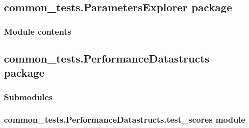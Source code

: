 \documentclass[letterpaper,10pt,english]{sphinxmanual}
\begin{document}
\subsection{common\_tests.ParametersExplorer package}
\label{\detokenize{common_tests.ParametersExplorer:common-tests-parametersexplorer-package}}\label{\detokenize{common_tests.ParametersExplorer::doc}}

\subsubsection{Module contents}
\label{\detokenize{common_tests.ParametersExplorer:module-common_tests.ParametersExplorer}}\label{\detokenize{common_tests.ParametersExplorer:module-contents}}

\subsection{common\_tests.PerformanceDatastructs package}
\label{\detokenize{common_tests.PerformanceDatastructs:common-tests-performancedatastructs-package}}\label{\detokenize{common_tests.PerformanceDatastructs::doc}}

\subsubsection{Submodules}
\label{\detokenize{common_tests.PerformanceDatastructs:submodules}}

\subsubsection{common\_tests.PerformanceDatastructs.test\_scores module}
\label{\detokenize{common_tests.PerformanceDatastructs:module-common_tests.PerformanceDatastructs.test_scores}}\label{\detokenize{common_tests.PerformanceDatastructs:common-tests-performancedatastructs-test-scores-module}}
\end{document}
